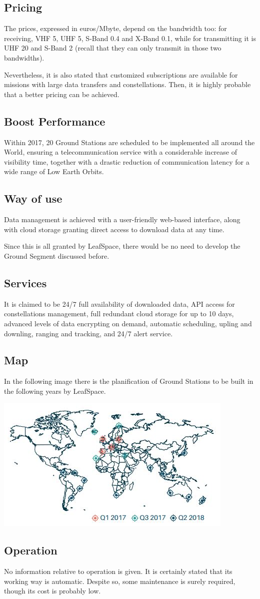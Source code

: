 \documentclass[12pt,a4paper]{report}
\begin{document}
\subsection{Pricing}
The prices, expressed in euros/Mbyte, depend on the bandwidth too: for receiving, VHF 5, UHF 5, S-Band 0.4 and X-Band 0.1, while for transmitting it is UHF 20 and S-Band 2 (recall that they can only transmit in those two bandwidths). 

Nevertheless, it is also stated that customized subscriptions are available for missions with large data transfers and constellations. Then, it is highly probable that a better pricing can be achieved. 

\subsection{Boost Performance}
Within 2017, 20 Ground Stations are scheduled to be implemented all around the World, ensuring a telecommunication service with a considerable increase of visibility time, together with a drastic reduction of communication latency for a wide range of Low Earth Orbits. 

\subsection{Way of use}
Data management is achieved with a user-friendly web-based interface, along with cloud storage granting direct access to download data at any time. 

Since this is all granted by LeafSpace, there would be no need to develop the Ground Segment discussed before. 

\subsection{Services}
It is claimed to be 24/7 full availability of downloaded data, API access for constellations management, full redundant cloud storage for up to 10 days, advanced levels of data encrypting on demand, automatic scheduling, upling and downling, ranging and tracking, and 24/7 alert service. 

\subsection{Map}
In the following image there is the planification of Ground Stations to be built in the following years by LeafSpace. 

\includegraphics{LeafSpace.jpg}

\subsection{Operation}
No information relative to operation is given. It is certainly stated that its working way is automatic. Despite so, some maintenance is surely required, though its cost is probably low.
\end{document}

